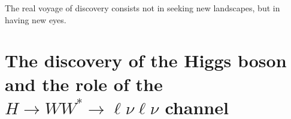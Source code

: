 \begin{savequote}[75mm]
The real voyage of discovery consists not in seeking new landscapes, but in having new eyes.
\end{savequote}

\chapter{The discovery of the Higgs boson and the role of the $H\rightarrow WW^{*}\rightarrow \ell\nu\ell\nu$ channel}
